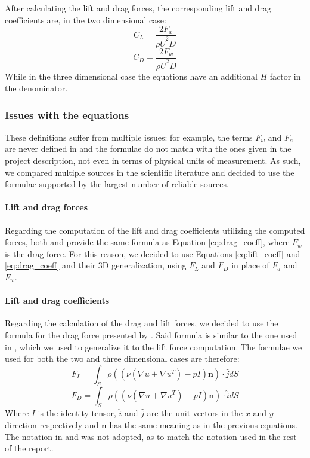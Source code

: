 After calculating the lift and drag forces, the corresponding lift and drag coefficients are, in the two dimensional case:
\begin{equation}\label{eq:lift_coeff}
    C_L = \frac{2F_a}{\rho \bar{U}^2 D}
\end{equation}
\begin{equation}\label{eq:drag_coeff}
    C_D = \frac{2F_w}{\rho \bar{U}^2 D}
\end{equation}
While in the three dimensional case the equations have an additional $H$ factor in the denominator.

\subsubsection{Issues with the equations}
These definitions suffer from multiple issues: for example, the terms $F_w$ and $F_a$ are never defined in \cite{Cylinder} and the formulae do not match with the ones given in the project description, not even in terms of physical units of measurement. As such, we compared multiple sources in the scientific literature and decided to use the formulae supported by the largest number of reliable sources. 

\paragraph{Lift and drag forces}
Regarding the computation of the lift and drag coefficients utilizing the computed forces, both \cite{Dede} and \cite{lift_drag} provide the same formula as Equation \ref{eq:drag_coeff}, where $F_w$ is the drag force.  For this reason, we decided to use Equations \ref{eq:lift_coeff} and \ref{eq:drag_coeff} and their 3D generalization, using $F_L$ and $F_D$ in place of $F_a$ and $F_w$.

\paragraph{Lift and drag coefficients}
Regarding the calculation of the drag and lift forces, we decided to use the formula for the drag force presented by \cite{Dede}. Said formula is similar to the one used in \cite{lift_drag}, which we used to generalize it to the lift force computation. The formulae we used for both the two and three dimensional cases are therefore:
\begin{equation}\label{eq:lift_force}
    F_L = \int_S \rho ((\nu (\nabla u + \nabla u^T) - p I)\mathbf{n}) \cdot \hat{j} dS
\end{equation}
\begin{equation}\label{eq:drag_force}
    F_D = \int_S \rho ((\nu (\nabla u + \nabla u^T) - p I)\mathbf{n}) \cdot \hat{i} dS
\end{equation}
Where $I$ is the identity tensor, $\hat{i}$ and $\hat{j}$ are the unit vectors in the $x$ and $y$ direction respectively and $\mathbf{n}$ has the same meaning as in the previous equations. The notation in \cite{Dede} and \cite{lift_drag} was not adopted, as to match the notation used in the rest of the report.

